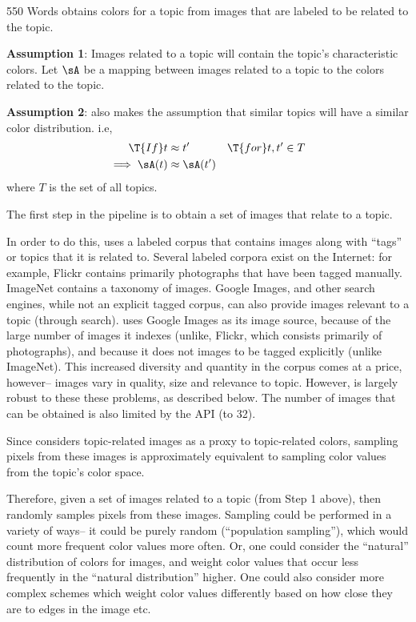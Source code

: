 550 Words
\system obtains colors for a topic from images that are labeled to be related to the topic. 

\textbf {Assumption 1}: Images related to a topic will contain the topic's characteristic colors. Let $\sA$ be a mapping between images related to a topic to the colors related to the topic.

\textbf{Assumption 2}: \system also makes the assumption that similar topics will have a similar color distribution. i.e, 
\begin{align*}
\T{If } t &\approx t' & \T{for } t, t' \in T \\
\implies \sA(t) &\approx \sA(t')
\end{align*} 
where $T$ is the set of all topics.


The first step in the \system pipeline is to obtain a set of images that relate to a topic.

In order to do this, \system uses a labeled corpus that contains images along with ``tags'' or topics that it is related to. Several labeled corpora exist on the Internet: for example, Flickr contains primarily photographs that have been tagged manually. ImageNet contains a taxonomy of images.  Google Images, and other search engines, while not an explicit tagged corpus, can also provide images relevant to a topic (through search). \system uses Google Images as its image source, because of the large number of images it indexes (unlike, Flickr, which consists primarily of photographs), and because it does not images to be tagged explicitly (unlike ImageNet). This increased diversity and quantity in the corpus comes at a price, however-- images vary in quality, size and relevance to topic. However, \system is largely robust to these these problems, as described below. The number of images that can be obtained is also limited by the API (to 32).

Since \system considers topic-related images as a proxy to topic-related colors, sampling pixels from these images is approximately equivalent to sampling color values from the topic's color space. 

Therefore, given a set of images related to a topic (from Step 1 above), \system then randomly samples pixels from these images. Sampling could be performed in a variety of ways-- it could be purely random (``population sampling''), which would count more frequent color values more often. Or, one could consider the ``natural'' distribution of colors for images, and weight color values that occur less frequently in the ``natural distribution'' higher. One could also consider more complex schemes which weight color values differently based on how close they are to edges in the image etc.

